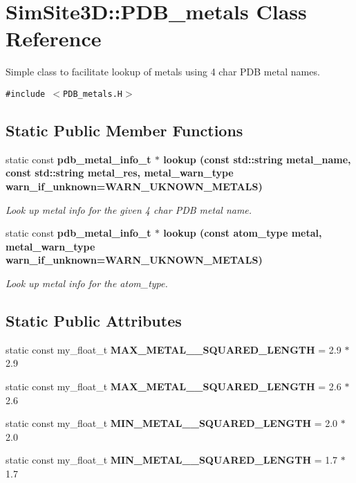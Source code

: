 \section{SimSite3D::PDB\_\-metals Class Reference}
\label{classSimSite3D_1_1PDB__metals}
Simple class to facilitate lookup of metals using 4 char PDB metal names.  


{\tt \#include $<$PDB\_\-metals.H$>$}

\subsection*{Static Public Member Functions}
\begin{CompactItemize}
\item 
static const \bf{pdb\_\-metal\_\-info\_\-t} $\ast$ \bf{lookup} (const std::string metal\_\-name, const std::string metal\_\-res, metal\_\-warn\_\-type warn\_\-if\_\-unknown=WARN\_\-UKNOWN\_\-METALS)
\begin{CompactList}\small\item\em Look up metal info for the given 4 char PDB metal name. \item\end{CompactList}\item 
static const \bf{pdb\_\-metal\_\-info\_\-t} $\ast$ \bf{lookup} (const atom\_\-type metal, metal\_\-warn\_\-type warn\_\-if\_\-unknown=WARN\_\-UKNOWN\_\-METALS)
\begin{CompactList}\small\item\em Look up metal info for the atom\_\-type. \item\end{CompactList}\end{CompactItemize}
\subsection*{Static Public Attributes}
\begin{CompactItemize}
\item 
static const my\_\-float\_\-t \textbf{MAX\_\-METAL\_\_\-SQUARED\_\-LENGTH} = 2.9 $\ast$ 2.9\label{classSimSite3D_1_1PDB__metals_ccfed2ea9c7249c7a3c8c2f9b6a896fe}

\item 
static const my\_\-float\_\-t \textbf{MAX\_\-METAL\_\_\-SQUARED\_\-LENGTH} = 2.6 $\ast$ 2.6\label{classSimSite3D_1_1PDB__metals_41d57fb651b1afe0b2bdb68a51ff5642}

\item 
static const my\_\-float\_\-t \textbf{MIN\_\-METAL\_\_\-SQUARED\_\-LENGTH} = 2.0 $\ast$ 2.0\label{classSimSite3D_1_1PDB__metals_085856c7568fa2d9d9c2ef26fe41df1f}

\item 
static const my\_\-float\_\-t \textbf{MIN\_\-METAL\_\_\-SQUARED\_\-LENGTH} = 1.7 $\ast$ 1.7\label{classSimSite3D_1_1PDB__metals_d83053987cd3dedfc2dd399d6aa8881c}

\end{CompactItemize}
